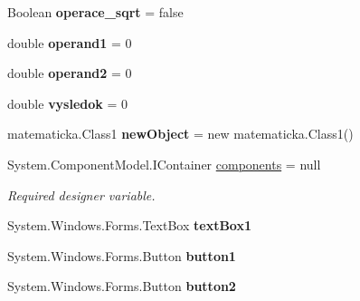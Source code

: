 \begin{DoxyCompactItemize}
\item 
Boolean {\bfseries operace\+\_\+sqrt} = false\hypertarget{class_windows_forms_application7_1_1_form1_a8bd9e8ef249f029fa40e57aa3174a503}{}\label{class_windows_forms_application7_1_1_form1_a8bd9e8ef249f029fa40e57aa3174a503}

\item 
double {\bfseries operand1} = 0\hypertarget{class_windows_forms_application7_1_1_form1_aec9aee3dc421f608d443d33495559958}{}\label{class_windows_forms_application7_1_1_form1_aec9aee3dc421f608d443d33495559958}

\item 
double {\bfseries operand2} = 0\hypertarget{class_windows_forms_application7_1_1_form1_ac1a57710bb57f32de2414de515173528}{}\label{class_windows_forms_application7_1_1_form1_ac1a57710bb57f32de2414de515173528}

\item 
double {\bfseries vysledok} = 0\hypertarget{class_windows_forms_application7_1_1_form1_a8c29e2f179d06ce59b1544d133533d1e}{}\label{class_windows_forms_application7_1_1_form1_a8c29e2f179d06ce59b1544d133533d1e}

\item 
matematicka.\+Class1 {\bfseries new\+Object} = new matematicka.\+Class1()\hypertarget{class_windows_forms_application7_1_1_form1_ab464987fdce1f221be67c20ceb8b9e94}{}\label{class_windows_forms_application7_1_1_form1_ab464987fdce1f221be67c20ceb8b9e94}

\item 
System.\+Component\+Model.\+I\+Container \hyperlink{class_windows_forms_application7_1_1_form1_a40a2aa9887f212867bdfee9a667b9860}{components} = null
\begin{DoxyCompactList}\small\item\em Required designer variable. \end{DoxyCompactList}\item 
System.\+Windows.\+Forms.\+Text\+Box {\bfseries text\+Box1}\hypertarget{class_windows_forms_application7_1_1_form1_a812b1e343c0c28b14687bbcff0abf524}{}\label{class_windows_forms_application7_1_1_form1_a812b1e343c0c28b14687bbcff0abf524}

\item 
System.\+Windows.\+Forms.\+Button {\bfseries button1}\hypertarget{class_windows_forms_application7_1_1_form1_aad417f0c4fb3c2a3dfcd1a25396aee9e}{}\label{class_windows_forms_application7_1_1_form1_aad417f0c4fb3c2a3dfcd1a25396aee9e}

\item 
System.\+Windows.\+Forms.\+Button {\bfseries button2}\hypertarget{class_windows_forms_application7_1_1_form1_ae79069e1e69955d1312c544bc0556bd3}{}\label{class_windows_forms_application7_1_1_form1_ae79069e1e69955d1312c544bc0556bd3}


\end{DoxyCompactItemize}

